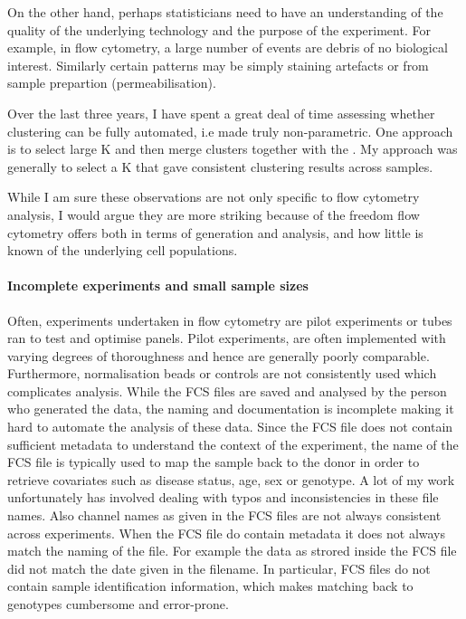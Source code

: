 On the other hand, perhaps statisticians need to have an understanding of the quality of the underlying technology and the purpose of the experiment.
For example, in flow cytometry, a large number of events are debris of no biological interest.
Similarly certain patterns may be simply staining artefacts or from sample prepartion (permeabilisation).

Over the last three years, I have spent a great deal of time assessing whether clustering can be fully automated, i.e made truly non-parametric.
One approach is to select large K and then merge clusters together with the .
My approach was generally to select a K that gave consistent clustering results across samples.

While I am sure these observations are not only specific to flow cytometry analysis, I would argue they are more striking because of the freedom flow cytometry offers both in terms of generation and analysis, and how little is known of the underlying cell populations.


\paragraph{ Incomplete experiments and small sample sizes}

Often, experiments undertaken in flow cytometry are pilot experiments or tubes ran to test and optimise panels.
Pilot experiments,
are often implemented with varying degrees of thoroughness and hence are generally poorly comparable.
Furthermore, normalisation beads or controls are not consistently used which complicates analysis.
While the FCS files are saved and analysed by the person who generated the data, the naming and documentation is incomplete
making it hard to automate the analysis of these data.
Since the FCS file does not contain sufficient metadata to understand the context of the experiment, the name of the FCS file is typically used to map the sample back to the donor in order to retrieve covariates such as disease status, age, sex or genotype.
A lot of my work unfortunately has involved dealing with typos and inconsistencies in these file names.
Also channel names as given in the FCS files are not always consistent across experiments.
When the FCS file do contain metadata it does not always match the naming of the file.
For example the data as strored inside the FCS file did not match the date given in the filename.
In particular, FCS files do not contain sample identification information, which makes matching back to genotypes cumbersome and error-prone.

